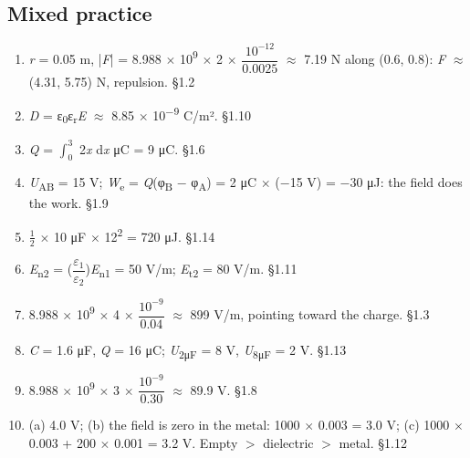 \documentclass[11pt]{article}
\begin{document}
\begin{keepsection}\subsection{Mixed practice}

\begin{enumerate}
\item \textit{r} = 0.05 m, |\textit{F}| = 8.988 \ensuremath{\times} 10\textsuperscript{9} \ensuremath{\times} 2 \ensuremath{\times} {\small\ensuremath{\dfrac{10^{-12}}{0.0025}}} \ensuremath{\approx} 7.19 N along (0.6, 0.8): \textit{F} \ensuremath{\approx} (4.31, 5.75) N, repulsion. \hfill{\small\color{FAUblue}§1.2}
\item \textit{D} = ε\textsubscript{0}ε\textsubscript{r}\textit{E} \ensuremath{\approx} 8.85 \ensuremath{\times} 10\textsuperscript{\ensuremath{-}9} C/m². \hfill{\small\color{FAUblue}§1.10}
\item \textit{Q} = $\int_{0}^{3} $ 2\textit{x} d\textit{x} μC = 9 μC. \hfill{\small\color{FAUblue}§1.6}
\item \textit{U}\textsubscript{AB} = 15 V; \textit{W}\textsubscript{e} = \textit{Q}(φ\textsubscript{B} \ensuremath{-} φ\textsubscript{A}) = 2 μC \ensuremath{\times} (\ensuremath{-}15 V) = \ensuremath{-}30 μJ: the field does the work. \hfill{\small\color{FAUblue}§1.9}
\item \ensuremath{\tfrac12} \ensuremath{\times} 10 μF \ensuremath{\times} 12\textsuperscript{2} = 720 μJ. \hfill{\small\color{FAUblue}§1.14}
\item \textit{E}\textsubscript{n2} = ({\small\ensuremath{\dfrac{ε_{1}}{ε_{2}}}})\textit{E}\textsubscript{n1} = 50 V/m; \textit{E}\textsubscript{t2} = 80 V/m. \hfill{\small\color{FAUblue}§1.11}
\item 8.988 \ensuremath{\times} 10\textsuperscript{9} \ensuremath{\times} 4 \ensuremath{\times} {\small\ensuremath{\dfrac{10^{-9}}{0.04}}} \ensuremath{\approx} 899 V/m, pointing toward the charge. \hfill{\small\color{FAUblue}§1.3}
\item \textit{C} = 1.6 μF, \textit{Q} = 16 μC; \textit{U}\textsubscript{2μF} = 8 V, \textit{U}\textsubscript{8μF} = 2 V. \hfill{\small\color{FAUblue}§1.13}
\item 8.988 \ensuremath{\times} 10\textsuperscript{9} \ensuremath{\times} 3 \ensuremath{\times} {\small\ensuremath{\dfrac{10^{-9}}{0.30}}} \ensuremath{\approx} 89.9 V. \hfill{\small\color{FAUblue}§1.8}
\item (a) 4.0 V; (b) the field is zero in the metal: 1000 \ensuremath{\times} 0.003 = 3.0 V; (c) 1000 \ensuremath{\times} 0.003 + 200 \ensuremath{\times} 0.001 = 3.2 V. Empty \ensuremath{>} dielectric \ensuremath{>} metal. \hfill{\small\color{FAUblue}§1.12}

\end{enumerate}
\end{keepsection}
\end{document}
